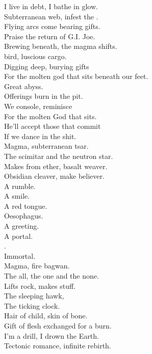 I live in debt, I bathe in glow. \\
Subterranean web, infest the . \\
Flying arcs come bearing gifts. \\
Praise the return of G.I. Joe. \\

Brewing beneath, the magma shifts. \\
 bird, luscious cargo. \\
Digging deep, burying gifts \\
For the molten god that sits beneath our feet. \\

Great abyss. \\
Offerings burn in the pit. \\
We console, reminisce \\
For the molten God that sits. \\
He'll accept those that commit \\
If we dance in the shit. \\

Magma, subterranean tsar. \\
The scimitar and the neutron star. \\
Makes from ether, basalt weaver. \\
Obsidian cleaver, make believer. \\

A rumble. \\
A smile. \\
A red tongue. \\
Oesophagus. \\
A greeting. \\
A portal. \\
. \\
Immortal. \\

Magma, fire bagwan. \\
The all, the one and the none. \\
Lifts rock, makes stuff. \\
The sleeping hawk, \\
The ticking clock. \\

Hair of child, skin of bone. \\
Gift of flesh exchanged for a burn. \\
I'm a drill, I drown the Earth. \\
Tectonic romance, infinite rebirth. \\

